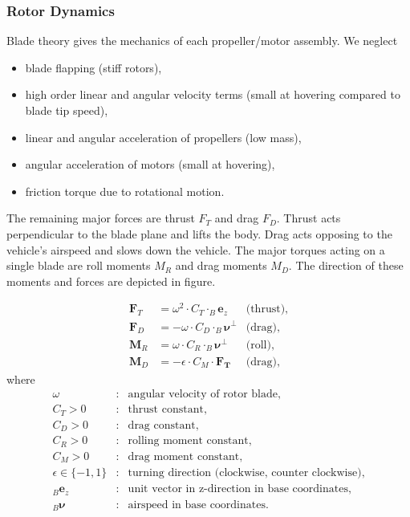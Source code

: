 \subsubsection{Rotor Dynamics}
Blade theory gives the mechanics of each propeller/motor assembly. We neglect 
\begin{itemize} 
\item blade flapping (stiff rotors),
\item high order linear and angular velocity terms (small at hovering compared to blade tip speed),
\item linear and angular acceleration of propellers (low mass),
\item angular acceleration of motors (small at hovering),
\item friction torque due to rotational motion.
\end{itemize}

The remaining major forces are thrust $F_T$ and drag $F_D$. Thrust acts perpendicular to the blade plane and lifts the body. Drag acts opposing to the vehicle's airspeed and slows down the vehicle. The major torques acting on a single blade are roll moments $M_R$ and drag moments $M_D$. The direction of these moments and forces are depicted in figure. 

\begin{align}
\mathbf{F}_T&= \omega^2 \cdot C_T \cdot _B\mathbf{e}_z  &\text{(thrust)} ,\label{eq:rotor_begin} \\
\mathbf{F}_D&= -\omega \cdot  C_D \cdot _B\mathbf{\boldsymbol{\nu}}^\perp  &\text{(drag)} , \label{eq:drag_force}\\
\mathbf{M}_R&= \omega \cdot C_R \cdot _B\mathbf{\boldsymbol{\nu}}^\perp &\text{(roll)} , \\
\mathbf{M}_D&= -\epsilon \cdot C_M \cdot \mathbf{F_T}  &\text{(drag)}, \label{eq:rotor_end}
\end{align}
where
\begin{align*}
\omega &: &\text{angular velocity of rotor blade}, \\
C_T>0 &: &\text{thrust constant}, \\
C_D>0 &: &\text{drag constant}, \\
C_R>0 &: &\text{rolling moment constant}, \\
C_M>0 &: &\text{drag moment constant}, \\
\epsilon\in\{-1,1\} &: &\text{turning direction (clockwise, counter clockwise)}, \\
_B\mathbf{e}_z &: &\text{unit vector in z-direction in base coordinates},\\
_B\mathbf{\boldsymbol{\nu}} &: &\text{airspeed in base coordinates} .
\end{align*}

